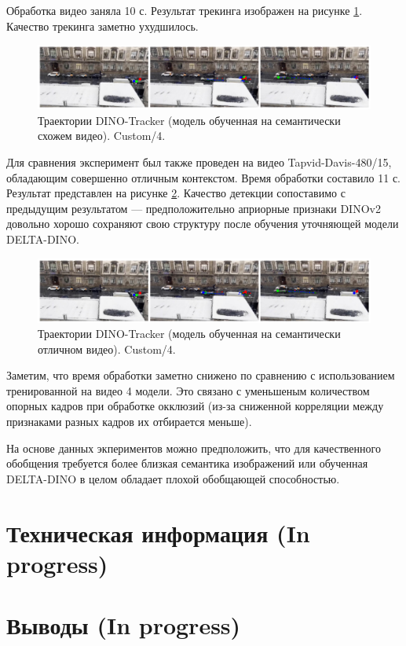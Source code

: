 \documentclass[a4paper, 14pt]{extarticle}
\theoremstyle{definition}
\theoremstyle{plain}
\theoremstyle{remark}
\begin{document}
Обработка видео заняла 10 с. Результат трекинга изображен на рисунке \ref{fig:custom-4-sem}. Качество трекинга заметно ухудшилось.
\begin{figure}
    [H]
    \centering
    \includegraphics[width=\textwidth]{figs/custom-4-sem.png}
    \caption{Траектории DINO-Tracker (модель обученная на семантически схожем видео). Custom/4.}
    \label{fig:custom-4-sem}
\end{figure}

Для сравнения эксперимент был также проведен на видео Tapvid-Davis-480/15, обладающим совершенно отличным контекстом. Время обработки составило 11 с. Результат представлен на рисунке \ref{fig:custom-4-bad-sem}. Качество детекции сопоставимо с предыдущим результатом --- предположительно априорные признаки DINOv2 довольно хорошо сохраняют свою структуру после обучения уточняющей модели DELTA-DINO.
\begin{figure}
    [H]
    \centering
    \includegraphics[width=\textwidth]{figs/custom-4-bad-sem.png}
    \caption{Траектории DINO-Tracker (модель обученная на семантически отличном видео). Custom/4.}
    \label{fig:custom-4-bad-sem}
\end{figure}

Заметим, что время обработки заметно снижено по сравнению с использованием тренированной на видео 4 модели. Это связано с уменьшеным количеством опорных кадров при обработке окклюзий (из-за сниженной корреляции между признаками разных кадров их отбирается меньше).

На основе данных экпериментов можно предположить, что для качественного обобщения требуется более близкая семантика изображений или обученная DELTA-DINO в целом обладает плохой обобщающей способностью.

\newpage


\section{Техническая информация (In progress)}
\newpage


\section{Выводы (In progress)}
\newpage
\end{document}
